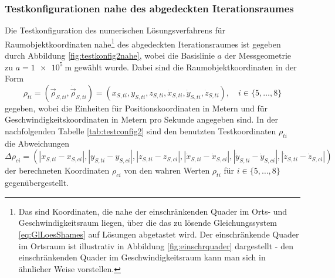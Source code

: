 \documentclass[a4paper,12pt]{article}
\numberwithin{equation}{section}
\begin{document}
\subsubsection{Testkonfigurationen nahe des abgedeckten Iterationsraumes}\label{sec:testkonfig2}
Die Testkonfiguration des numerischen Lösungsverfahrens für Raumobjektkoordinaten nahe\footnote{Das sind Koordinaten, die nahe der einschränkenden Quader im Orts- und Geschwindigkeitsraum liegen, über die das zu lösende Gleichungssystem \eqref{eq:GlLoesShames} auf Lösungen abgetastet wird. Der einschränkende Quader im Ortsraum ist illustrativ in Abbildung \ref{fig:einschrquader} dargestellt - den einschränkenden Quader im Geschwindigkeitsraum kann man sich in ähnlicher Weise vorstellen.} des abgedeckten Iterationsraumes ist gegeben durch Abbildung \ref{fig:testkonfig2nahe}, wobei die Basislinie $a$ der Messgeometrie zu $a = \SI{1e5}{\meter}$ gewählt wurde. Dabei sind die Raumobjektkoordinaten in der Form \begin{equation}
\rho_{ti} = (\vec{\rho}_{S,ti},\dot{\vec{\rho}}_{S,ti}) =  (x_{S,ti},y_{S,ti},z_{S,ti},\dot{x}_{S,ti},\dot{y}_{S,ti},\dot{z}_{S,ti}), \quad i \in \{5,\dots,8\}
\end{equation} gegeben, wobei die Einheiten für Positionskoordinaten in Metern und für Geschwindigkeitskoordinaten in Metern pro Sekunde angegeben sind. In der nachfolgenden Tabelle \ref{tab:testconfig2} sind den benutzten Testkoordinaten $\rho_{ti}$ die Abweichungen \begin{equation} \Delta \rho_{ci} = (|x_{S,ti}-x_{S,ci}|,|y_{S,ti}-y_{S,ci}|,|z_{S,ti}-z_{S,ci}|,|\dot{x}_{S,ti}-\dot{x}_{S,ci}|,|\dot{y}_{S,ti}-\dot{y}_{S,ci}|,|\dot{z}_{S,ti}-\dot{z}_{S,ci}|)\end{equation} der berechneten Koordinaten $\rho_{ci}$ von den wahren Werten $\rho_{ti}$ für $ i \in \{5,\dots,8\}$ gegenübergestellt.
\end{document}
